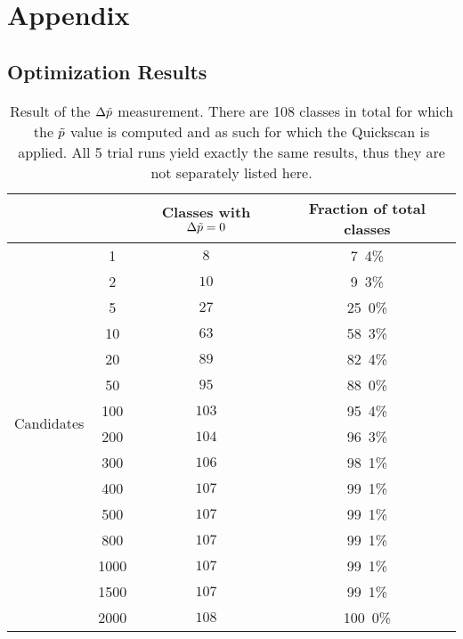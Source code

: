 

\renewcommand\thechapter{A}
\chapter*{Appendix}

\section*{Optimization Results}

\begin{table}[htbp]
	\centering
	\begin{tabular}{| c | c | c ||  c | }
		\cline{3-4} 
		\multicolumn{2}{c|}{} & Classes with $\Delta \tilde{p} = 0$ & Fraction of total classes \\
		
		\hline
		\multirow{14}{*}{\begin{sideways}Candidates\end{sideways}}
		
	& 1 & $8$ & \unit{7.4}{\%} \\ 
	& 2 & $10$ & \unit{9.3}{\%} \\ 
	& 5 & $27$ & \unit{25.0}{\%} \\ 
	& 10 & $63$ & \unit{58.3}{\%} \\ 
	& 20 & $89$ & \unit{82.4}{\%} \\ 
	& 50 & $95$ & \unit{88.0}{\%} \\ 
	& 100 & $103$ & \unit{95.4}{\%} \\ 
	& 200 & $104$ & \unit{96.3}{\%} \\ 
	& 300 & $106$ & \unit{98.1}{\%} \\ 
	& 400 & $107$ & \unit{99.1}{\%} \\ 
	& 500 & $107$ & \unit{99.1}{\%} \\ 
	& 800 & $107$ & \unit{99.1}{\%} \\ 
	& 1000 & $107$ & \unit{99.1}{\%} \\ 
	& 1500 & $107$ & \unit{99.1}{\%} \\ 
	& 2000 & $108$ & \unit{100.0}{\%} \\ 
		
		\hline
	\end{tabular}
	\caption{Result of the $\Delta \tilde{p}$ measurement. There are 108 classes in total for which the $\tilde{p}$ value is computed and as such for which the Quickscan is applied. All 5 trial runs yield exactly the same results, thus they are not separately listed here.}
	\label{tbl:deltaptilde_results}
\end{table}

